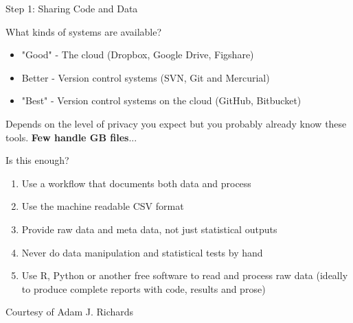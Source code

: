 \documentclass[xcolor=x11names,compress,8pt]{beamer}
\renewcommand{\(}{\begin{columns}}
\renewcommand{\)}{\end{columns}}
\newcommand{\<}[1]{\begin{column}{#1}}
\renewcommand{\>}{\end{column}}
\begin{document}
\begin{frame}[label=sec-3-2-4]{Step 1: Sharing Code and Data}
\begin{overlayarea}{\linewidth}{7.6cm}\null\vspace{-.6cm}
\begin{block}{What kinds of systems are available?}
\begin{itemize}
\item "Good" - The cloud (Dropbox, Google Drive, \alert{Figshare})
\item \alert{Better} - Version control systems (SVN, \alert{Git} and Mercurial)
\item "Best" - Version control systems on the cloud (GitHub, Bitbucket)
\end{itemize}

Depends on the level of privacy you expect but you probably already
know these tools. 
\hfill\textbf{\bf Few handle GB files}...\hfill\null
\end{block}\begin{block}{Is this enough?}
\begin{enumerate}
\item Use a workflow that \alert{documents both data and process}
\item Use the machine readable \alert{CSV format}
\item Provide \alert{raw} data and \alert{meta} data, not just statistical outputs
\item \alert{Never} do data manipulation and statistical tests \alert{by hand}
\item \alert{Use R}, Python or another free software to read and process raw
data (\alert{ideally} to \alert{produce complete reports} with code, results
and prose)
\end{enumerate}
\end{block}

\end{overlayarea} \begin{flushright}\scriptsize Courtesy of Adam J. Richards\end{flushright}
\end{frame}
\end{document}
